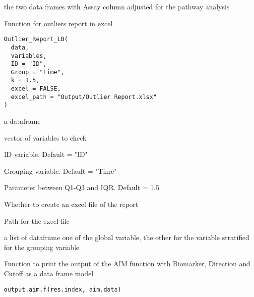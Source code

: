\documentclass[a4paper]{book}
\begin{document}
%
\begin{Value}
the two data frames with Assay column adjusted for the pathway analysis
\end{Value}
%
\begin{Description}
Function for outliers report in excel
\end{Description}
%
\begin{Usage}
\begin{verbatim}
Outlier_Report_LB(
  data,
  variables,
  ID = "ID",
  Group = "Time",
  k = 1.5,
  excel = FALSE,
  excel_path = "Output/Outlier Report.xlsx"
)
\end{verbatim}
\end{Usage}
%
\begin{Arguments}
\begin{ldescription}
\item[\code{data}] a dataframe

\item[\code{variables}] vector of variables to check

\item[\code{ID}] ID variable. Default = "ID"

\item[\code{Group}] Grouping variable. Default = "Time"

\item[\code{k}] Parameter between Q1-Q3 and IQR. Default = 1.5

\item[\code{excel}] Whether to create an excel file of the report

\item[\code{excel\_path}] Path for the excel file
\end{ldescription}
\end{Arguments}
%
\begin{Value}
a list of dataframe one of the global variable, the other for the variable stratified for the grouping variable
\end{Value}
%
\begin{Description}
Function to print the output of the AIM function with Biomarker, Direction and Cutoff as a data frame model
\end{Description}
%
\begin{Usage}
\begin{verbatim}
output.aim.f(res.index, aim.data)
\end{verbatim}
\end{Usage}
\end{document}
